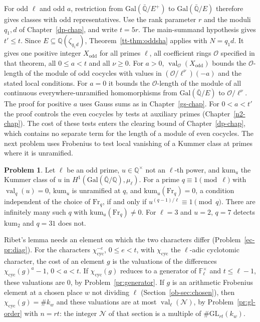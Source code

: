\documentclass[reqno]{amsart}
\newcounter{chap}
\theoremstyle{definition}
\newtheorem{problem}{Problem}[section]
\newcommand{\Q}{\mathbb{Q}}
\newcommand{\F}{\mathbb{F}}
\newcommand{\Oc}{\mathcal{O}}
\newcommand{\GL}{\mathrm{GL}}
\newcommand{\Frob}{\mathrm{Fr}}
\newcommand{\cyc}{\chi_{\mathrm{cyc}}}
\newcommand{\val}{\operatorname{val}}
\begin{document}
For odd \(\ell\) and odd \(a\), restriction from \(\mathrm{Gal}(\bar{\Q}/E^+)\) to \(\mathrm{Gal}(\bar{\Q}/E)\) therefore gives classes with odd representatives.  Use the rank parameter \(r\) and the moduli \(q_1,d\) of Chapter~\ref{dp-chap}, and write \(t = 5r\).  The main-summand hypothesis gives \(t' \le t\).  Since \(E \subseteq \Q(\zeta_{q_1d})\), Theorem~\ref{tt-thm:oddsha} applies with \(N = q_1d\).  It gives one positive integer \(X_{\mathrm{odd}}\) for all primes \(\ell\), all coefficient rings \(\Oc\) specified in that theorem, all \(0\le a<t\) and all \(\nu\ge0\).  For \(a>0\), \(\val_{\Oc}(X_{\mathrm{odd}})\) bounds the \(\Oc\)-length of the module of odd cocycles with values in \((\Oc/\ell^\nu)(-a)\) and the stated local conditions.  For \(a=0\) it bounds the \(\Oc\)-length of the module of all continuous everywhere-unramified homomorphisms from \(\mathrm{Gal}(\bar{\Q}/E)\) to \(\Oc/\ell^\nu\).  The proof for positive \(a\) uses Gauss sums as in Chapter~\ref{gs-chap}.  For \(0<a<t'\) the proof controls the even cocycles by tests at auxiliary primes (Chapter~\ref{n2-chap}).  The cost of these tests enters the clearing bound of Chapter~\ref{dp-chap}, which contains no separate term for the length of a module of even cocycles.  The next problem uses Frobenius to test local vanishing of a Kummer class at primes where it is unramified.

\begin{problem}\label{pr:kummer}
Let \(\ell\) be an odd prime, \(u \in \Q^\times\) not an \(\ell\)-th power, and \(\mathrm{kum}_u\) the Kummer class of \(u\) in \(H^1(\mathrm{Gal}(\bar{\Q}/\Q), \mu_\ell)\).  For a prime \(q \equiv 1 \pmod \ell\) with \(\val_q(u) = 0\), \(\mathrm{kum}_u\) is unramified at \(q\), and \(\mathrm{kum}_u(\Frob_q) = 0\), a condition independent of the choice of \(\Frob_q\), if and only if \(u^{(q-1)/\ell} \equiv 1 \pmod q\).  There are infinitely many such \(q\) with \(\mathrm{kum}_u(\Frob_q) \ne 0\).  For \(\ell = 3\) and \(u = 2\), \(q = 7\) detects \(\mathrm{kum}_2\) and \(q = 31\) does not.
\end{problem}

Ribet's lemma needs an element on which the two characters differ (Problem~\ref{ec-pr:diag}).  For the characters \(\cyc^{-e}\), \(0 \le e < t\), with \(\cyc\) the \(\ell\)-adic cyclotomic character, the cost of an element \(g\) is the valuations of the differences \(\cyc(g)^{a} - 1\), \(0 < a < t\).  If \(\cyc(g)\) reduces to a generator of \(\F_\ell^\times\) and \(t \le \ell - 1\), these valuations are \(0\), by Problem~\ref{pr:generator}.  If \(g\) is an arithmetic Frobenius element at a chosen place \(w\) not dividing \(\ell\) (Section~\ref{ob-sec:chosen}), then \(\cyc(g) = \#k_w\) and these valuations are at most \(\val_\ell(\mathcal N)\), by Problem~\ref{pr:gl-order} with \(n = rt\): the integer \(\mathcal N\) of that section is a multiple of \(\#\GL_{rt}(k_w)\).
\end{document}
